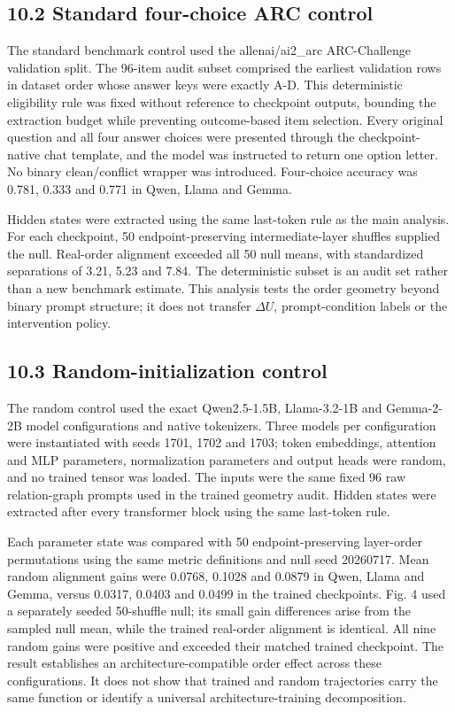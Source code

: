 \documentclass[10pt]{article}
\begin{document}
\subsection*{10.2 Standard four-choice ARC control}

The standard benchmark control used the allenai/ai2\_arc ARC-Challenge validation split. The 96-item audit subset comprised the earliest validation rows in dataset order whose answer keys were exactly A-D. This deterministic eligibility rule was fixed without reference to checkpoint outputs, bounding the extraction budget while preventing outcome-based item selection. Every original question and all four answer choices were presented through the checkpoint-native chat template, and the model was instructed to return one option letter. No binary clean/conflict wrapper was introduced. Four-choice accuracy was 0.781, 0.333 and 0.771 in Qwen, Llama and Gemma.

Hidden states were extracted using the same last-token rule as the main analysis. For each checkpoint, 50 endpoint-preserving intermediate-layer shuffles supplied the null. Real-order alignment exceeded all 50 null means, with standardized separations of 3.21, 5.23 and 7.84. The deterministic subset is an audit set rather than a new benchmark estimate. This analysis tests the order geometry beyond binary prompt structure; it does not transfer \(\Delta U\), prompt-condition labels or the intervention policy.

\subsection*{10.3 Random-initialization control}

The random control used the exact Qwen2.5-1.5B, Llama-3.2-1B and Gemma-2-2B model configurations and native tokenizers. Three models per configuration were instantiated with seeds 1701, 1702 and 1703; token embeddings, attention and MLP parameters, normalization parameters and output heads were random, and no trained tensor was loaded. The inputs were the same fixed 96 raw relation-graph prompts used in the trained geometry audit. Hidden states were extracted after every transformer block using the same last-token rule.

Each parameter state was compared with 50 endpoint-preserving layer-order permutations using the same metric definitions and null seed 20260717. Mean random alignment gains were 0.0768, 0.1028 and 0.0879 in Qwen, Llama and Gemma, versus 0.0317, 0.0403 and 0.0499 in the trained checkpoints. Fig. 4 used a separately seeded 50-shuffle null; its small gain differences arise from the sampled null mean, while the trained real-order alignment is identical. All nine random gains were positive and exceeded their matched trained checkpoint. The result establishes an architecture-compatible order effect across these configurations. It does not show that trained and random trajectories carry the same function or identify a universal architecture-training decomposition.
\end{document}
